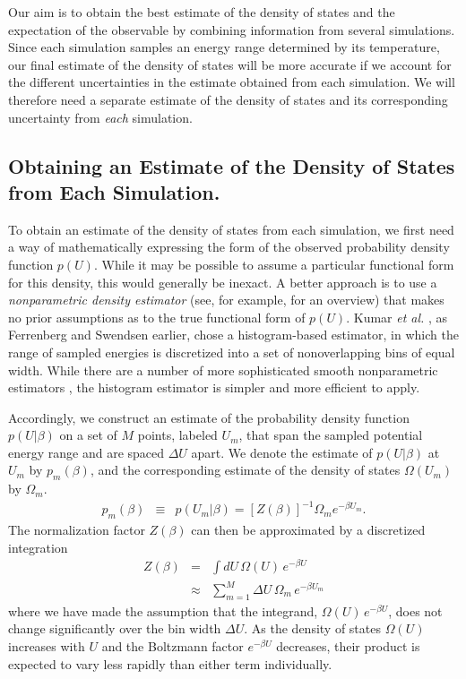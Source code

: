 Our aim is to obtain the best estimate of the density of states and the expectation of the observable by combining information from several simulations.  Since each simulation samples an energy range determined by its temperature, our final estimate of the density of states will be more accurate if we account for the different uncertainties in the estimate obtained from each simulation.  We will therefore need a separate estimate of the density of states and its corresponding uncertainty from \emph{each} simulation.

\subsection{Obtaining an Estimate of the Density of States from Each Simulation.}

To obtain an estimate of the density of states from each simulation, we first need a way of mathematically expressing the form of the observed probability density function $p(U)$.  While it may be possible to assume a particular functional form for this density, this would generally be inexact.  A better approach is to use a \emph{nonparametric density estimator} (see, for example, \cite{silverman-density-estimation} for an overview) that makes no prior assumptions as to the true functional form of $p(U)$.  Kumar \emph{et al.} \cite{kumar:1992a}, as Ferrenberg and Swendsen \cite{ferrenberg:1988a,ferrenberg:1989a} earlier, chose a histogram-based estimator, in which the range of sampled energies is discretized into a set of nonoverlapping bins of equal width.  While there are a number of more sophisticated smooth nonparametric estimators \cite{willard:1992a}, the histogram estimator is simpler and more efficient to apply.

Accordingly, we construct an estimate of the probability density function $p(U|\beta)$ on a set of $M$ points, labeled $U_m$, that span the sampled potential energy range and are spaced $\Delta U$ apart.  We denote the estimate of $p(U|\beta)$ at $U_m$ by $p_m(\beta)$, and the corresponding estimate of the density of states $\Omega(U_m)$ by $\Omega_m$.
\begin{eqnarray}
p_m(\beta) &\equiv& p(U_m | \beta) = [Z(\beta)]^{-1} \Omega_m e^{-\beta U_m} . \label{wham:equation:definition-of-p_m}
\end{eqnarray}
The normalization factor $Z(\beta)$ can then be approximated by a discretized integration
\begin{eqnarray}
Z(\beta) &=& \int dU \, \Omega(U) \, e^{-\beta U} \nonumber \\
&\approx& \sum_{m=1}^{M} \Delta U \, \Omega_m \, e^{-\beta U_m}
\end{eqnarray}
where we have made the assumption that the integrand, $\Omega(U) \, e^{-\beta U}$, does not change significantly over the bin width $\Delta U$.  As the density of states $\Omega(U)$ increases with $U$ and the Boltzmann factor $e^{-\beta U}$ decreases, their product is expected to vary less rapidly than either term individually.

